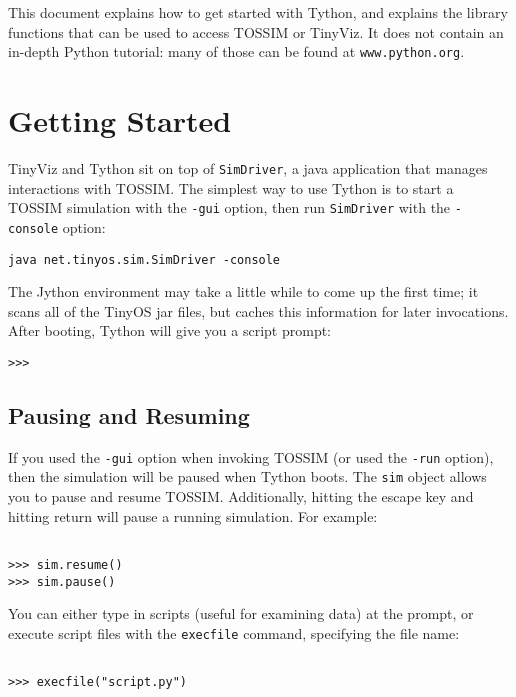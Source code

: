 \documentclass[10pt]{article}
\newcommand{\name}{{Tython}\xspace}
\newcommand{\driver}{{\tt SimDriver}\xspace}
\begin{document}
This document explains how to get started with \name, and explains the
library functions that can be used to access TOSSIM or TinyViz. It
does not contain an in-depth Python tutorial: many of those can be
found at {\tt www.python.org}.

\section{Getting Started}

TinyViz and \name sit on top of \driver, a java application that
manages interactions with TOSSIM. The simplest way to use \name is to
start a TOSSIM simulation with the {\tt -gui} option, then run \driver
with the {\tt -console} option:

\begin{verbatim}
java net.tinyos.sim.SimDriver -console
\end{verbatim}

The Jython environment may take a little while to come up the first
time; it scans all of the TinyOS jar files, but caches this
information for later invocations. After booting, \name will give you
a script prompt:

\begin{verbatim}
>>>
\end{verbatim}

\subsection{Pausing and Resuming}
\label{sec:pause}

If you used the {\tt -gui} option when invoking TOSSIM (or used the
{\tt -run} option), then the simulation will be paused when \name
boots. The {\tt sim} object allows you to pause and resume TOSSIM.
Additionally, hitting the escape key and hitting return will pause a
running simulation. For example:

\begin{verbatim}

>>> sim.resume()
>>> sim.pause()

\end{verbatim}

You can either type in scripts (useful for examining data) at the
prompt, or execute script files with the {\tt execfile} command,
specifying the file name:

\begin{verbatim}

>>> execfile("script.py")

\end{verbatim}
\end{document}
